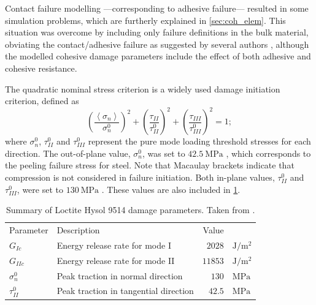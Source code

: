 \documentclass[cmfonts]{witpress}
\begin{document}
Contact failure modelling ---corresponding to adhesive failure--- resulted in some simulation problems, which are furtherly explained in \cref{sec:coh_elem}. This situation was overcome by including only failure definitions in the bulk material, obviating the contact/adhesive failure as suggested by several authors \cite{Greve2007, Loureiro2010, Sadowski2010, Sadowski2011, Scattina2011, Sadowski2014, SernaMoreno2015}, although the modelled cohesive damage parameters include the effect of both adhesive and cohesive resistance.

The quadratic nominal stress criterion is a widely used damage initiation criterion, defined as
\begin{equation}
\left(\frac{\left<\sigma_{n}\right>}{\sigma_{n}^{0}}\right)^{2} + \left(\frac{\tau_{II}}{\tau_{II}^{0}}\right)^{2} + \left(\frac{\tau_{III}}{\tau_{III}^{0}}\right)^{2} = 1 ;
\label{eq:quads}
\end{equation}
where $\sigma_{n}^{0}$, $\tau_{II}^{0}$ and $\tau_{III}^{0}$ represent the pure mode loading threshold stresses for each direction. The out-of-plane value, $\sigma_{n}^{0}$, was set to $\SI{42.5}{\MPa}$ \cite{Scattina2011}, which corresponds to the peeling failure stress for steel. Note that Macaulay brackets indicate that compression is not considered in failure initiation. Both in-plane values, $\tau_{II}^{0}$ and $\tau_{III}^{0}$, were set to $\SI{130}{\MPa}$ \cite{Scattina2011}. These values are also included in \cref{tab:ads_dmg_params}. %

\begin{table}
	\centering
	\begin{tabular}{llrl}

		

		Parameter & Description & Value & \\

		

		$G_{Ic}$ & Energy release rate for mode I & $\num{2028}$ & $\si{\J/\m^2}$ \\
		$G_{IIc}$ & Energy release rate for mode II & $\num{11853}$ & $\si{\J/\m^2}$ \\
		$\sigma_{n}^{0}$ & Peak traction in normal direction & $\num{130}$ & $\si{\MPa}$ \\
		$\tau_{II}^{0}$ & Peak traction in tangential direction & $\num{42.5}$ & $\si{\MPa}$ \\

		

	\end{tabular}
	\caption[Summary of Loctite Hysol 9514 damage parameters.]{Summary of Loctite Hysol 9514 damage parameters. Taken from \cite{Scattina2011}.}
	\label{tab:ads_dmg_params}
\end{table}
\end{document}
